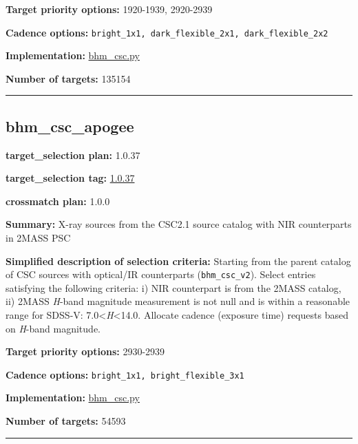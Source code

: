 \noindent\textbf{Target priority options:} 1920-1939, 2920-2939

\noindent\textbf{Cadence options:}
\texttt{bright\_1x1,\ dark\_flexible\_2x1,\ dark\_flexible\_2x2}

\noindent\textbf{Implementation:}
\href{https://github.com/sdss/target_selection/blob/1.0.37/python/target_selection/cartons/bhm_csc.py}{bhm\_csc.py}

\noindent\textbf{Number of targets:} 135154

\begin{center}\rule{0.5\linewidth}{0.5pt}\end{center}

\hypertarget{bhm_csc_apogee_plan1.0.37}{%
\subsection{bhm\_csc\_apogee}\label{bhm_csc_apogee_plan1.0.37}}

\noindent\textbf{target\_selection plan:} 1.0.37

\noindent\textbf{target\_selection tag:}
\href{https://github.com/sdss/target_selection/tree/1.0.37/}{1.0.37}

\noindent\textbf{crossmatch plan:} 1.0.0

\noindent\textbf{Summary:} X-ray sources from the CSC2.1 source catalog with NIR
counterparts in 2MASS PSC

\noindent\textbf{Simplified description of selection criteria:} Starting from the
parent catalog of CSC sources with optical/IR counterparts
(\texttt{bhm\_csc\_v2}). Select entries satisfying the following
criteria: i) NIR counterpart is from the 2MASS catalog, ii) 2MASS
\emph{H}-band magnitude measurement is not null and is within a
reasonable range for SDSS-V: 7.0\textless{}\emph{H}\textless14.0.
Allocate cadence (exposure time) requests based on \emph{H}-band
magnitude.


\noindent\textbf{Target priority options:} 2930-2939

\noindent\textbf{Cadence options:} \texttt{bright\_1x1,\ bright\_flexible\_3x1}

\noindent\textbf{Implementation:}
\href{https://github.com/sdss/target_selection/blob/1.0.37/python/target_selection/cartons/bhm_csc.py}{bhm\_csc.py}

\noindent\textbf{Number of targets:} 54593

\begin{center}\rule{0.5\linewidth}{0.5pt}\end{center}

